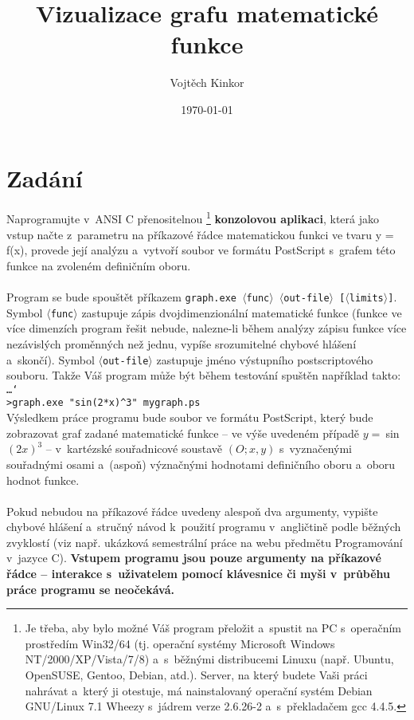 \documentclass[pdftex,a4paper]{article}
\title{Vizualizace grafu matematické funkce}
\author{Vojtěch Kinkor}
\date{\today}
\begin{document}


\newpage
\tableofcontents




\newpage
\section{Zadání}

Naprogramujte v~ANSI C přenositelnou
\footnote{Je třeba, aby bylo možné Váš program přeložit a~spustit na PC s~operačním prostředím Win32/64 (tj. operační systémy Microsoft Windows NT/2000/XP/Vista/7/8) a~s~běžnými distribucemi Linuxu (např. Ubuntu, OpenSUSE, Gentoo, Debian, atd.). Server, na který budete Vaši práci nahrávat a~který ji otestuje, má nainstalovaný operační systém Debian GNU/Linux 7.1 Wheezy s~jádrem verze 2.6.26-2 a~s~překladačem gcc 4.4.5.} 
\textbf{konzolovou aplikaci}, která jako vstup načte z~parametru na příkazové řádce matematickou funkci ve tvaru y = f(x), provede její analýzu a~vytvoří soubor ve formátu \textsf{PostScript} s~grafem této funkce na zvoleném definičním oboru.
\\\\
Program se bude spouštět příkazem \texttt{graph.exe $\langle$func$\rangle$ $\langle$out-file$\rangle$ [$\langle$limits$\rangle$]}. Symbol \texttt{$\langle$func$\rangle$}
zastupuje zápis dvojdimenzionální matematické funkce (funkce ve více dimenzích program řešit nebude, nalezne-li během analýzy zápisu funkce více nezávislých proměnných než jednu, vypíše srozumitelné chybové hlášení a~skončí). Symbol \texttt{$\langle$out-file$\rangle$} zastupuje jméno výstupního postscriptového souboru. Takže Váš program může být během testování spuštěn například takto:
\\[2mm]
\texttt{\ldots\char`\\ >graph.exe\ "sin(2*x)\^{}3"\ mygraph.ps}
\\[2mm]
Výsledkem práce programu bude soubor ve formátu \textsf{PostScript}, který bude zobrazovat graf zadané matematické funkce – ve výše uvedeném případě $y =\ $sin$(2x)^3$ – v~kartézské souřadnicové soustavě $(O; x, y)$ s~vyznačenými souřadnými osami a~(aspoň) význačnými hodnotami definičního oboru a~oboru hodnot funkce.
\\\\
Pokud nebudou na příkazové řádce uvedeny alespoň dva argumenty, vypište chybové hlášení a~stručný návod k~použití programu v~angličtině podle běžných zvyklostí (viz např. ukázková semestrální práce na webu předmětu Programování v~jazyce C). \textbf{Vstupem programu jsou pouze argumenty na příkazové řádce – interakce s~uživatelem pomocí klávesnice či myši v~průběhu práce programu se neočekává.}
\end{document}
